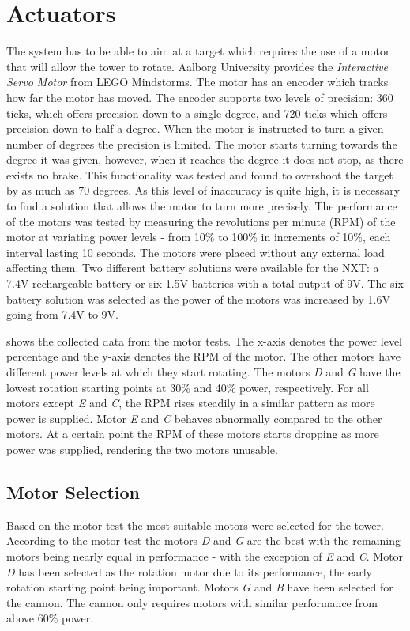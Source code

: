 \section{Actuators}\label{sec:actuators}
The system has to be able to aim at a target which requires the use of a motor that will allow the tower to rotate. Aalborg University provides the \textit{Interactive Servo Motor} from LEGO Mindstorms. The motor has an encoder which tracks how far the motor has moved. The encoder supports two levels of precision: 360 ticks, which offers precision down to a single degree, and 720 ticks which offers precision down to half a degree. When the motor is instructed to turn a given number of degrees the precision is limited. The motor starts turning towards the degree it was given, however, when it reaches the degree it does not stop, as there exists no brake. This functionality was tested and found to overshoot the target by as much as 70 degrees. As this level of inaccuracy is quite high, it is necessary to find a solution that allows the motor to turn more precisely. The performance of the motors was tested by measuring the revolutions per minute (RPM) of the motor at variating power levels - from 10\% to 100\% in increments of 10\%, each interval lasting 10 seconds. The motors were placed without any external load affecting them. Two different battery solutions were available for the NXT: a 7.4V rechargeable battery or six 1.5V batteries with a total output of 9V. The six battery solution was selected as the power of the motors was increased by 1.6V going from 7.4V to 9V.



 shows the collected data from the motor tests. The x-axis denotes the power level percentage and the y-axis denotes the RPM of the motor. The other motors have different power levels at which they start rotating. The motors \emph{D} and \emph{G} have the lowest rotation starting points at 30\% and 40\% power, respectively. For all motors except \emph{E} and \emph{C}, the RPM rises steadily in a similar pattern as more power is supplied. Motor \emph{E} and \emph{C} behaves abnormally compared to the other motors. At a certain point the RPM of these motors starts dropping as more power was supplied, rendering the two motors unusable.

\subsection{Motor Selection}
Based on the motor test the most suitable motors were selected for the tower. According to the motor test the motors \textit{D} and \textit{G} are the best with the remaining motors being nearly equal in performance - with the exception of \textit{E} and \textit{C}. Motor \textit{D} has been selected as the rotation motor due to its performance, the early rotation starting point being important. Motors \textit{G} and \textit{B} have been selected for the cannon. The cannon only requires motors with similar performance from above 60\% power.\\


